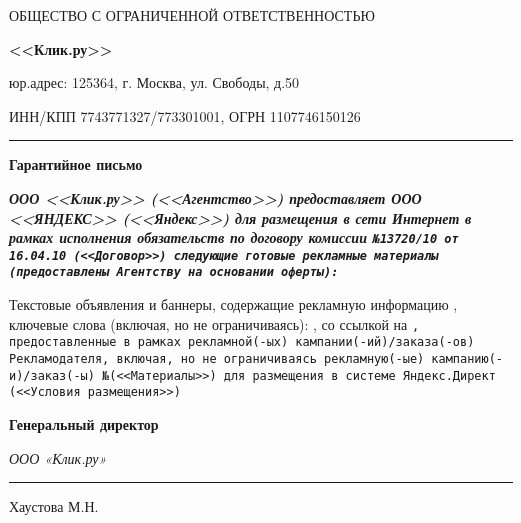 





\begin{center}
\large{ОБЩЕСТВО С ОГРАНИЧЕННОЙ ОТВЕТСТВЕННОСТЬЮ}

\Huge{\textbf{<<Клик.ру>>}}
\end{center}

\begin{small}
юр.адрес:  125364, г. Москва, ул. Свободы, д.50

ИНН/КПП 7743771327/773301001, ОГРН 1107746150126
\end{small}

\vspace{0.5em}

\hrule height 1pt

\vspace{1em}

\begin{center}\textbf{Гарантийное письмо}\end{center}

\noindent
\bf\sl ООО <<Клик.ру>> \rm (<<Агентство>>) предоставляет
\bf\sl ООО <<ЯНДЕКС>> \rm (<<Яндекс>>) для размещения в сети
Интернет в рамках исполнения обязательств по договору
комиссии \tt №13720/10 \rm от \tt 16.04.10 \rm (<<Договор>>) следующие
готовые рекламные материалы (предоставлены Агентству на основании оферты):

\vspace{1em}

\noindent
\rm Текстовые объявления и баннеры, содержащие рекламную информацию \advtheme,
ключевые слова (включая, но не ограничиваясь):
\keywords, со ссылкой на \tt \website\rm,
предоставленные в рамках рекламной(-ых) кампании(-ий)/заказа(-ов)
Рекламодателя, включая, но не ограничиваясь рекламную(-ые) кампанию(-и)/заказ(-ы)
\tt №\ordernums \rm (<<Материалы>>) для размещения в
системе Яндекс.Директ (<<Условия размещения>>)

\vspace{1em}



\vspace{3em}

\noindent
\bf Генеральный директор

\noindent
\sl ООО «Клик.ру» \hspace{5cm} \rule{5cm}{0.2mm}Хаустова М.Н.

\rm\bf



